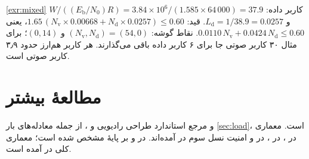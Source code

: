 \documentclass[11pt,a4paper]{article}
\begin{document}
\begin{solutionbox}{\ref{exr:mixed}}
کاربر داده: $W/((E_\mathrm{b}/N_0)R) = 3.84\times10^6/(1.585\times64\,000) = 37.9$ و
$L_\mathrm{d} = 1/38.9 = 0.0257$. قید:
$1.65\,(N_\mathrm{v}\times0.00668 + N_\mathrm{d}\times0.0257) \le 0.60$، یعنی
$0.0110\,N_\mathrm{v} + 0.0424\,N_\mathrm{d} \le 0.60$. نقاط گوشه: $(N_\mathrm{v},N_\mathrm{d}) =
(54,0)$ و $(0,14)$؛ برای مثال ۳۰ کاربر صوتی جا برای ۶ کاربر داده باقی می‌گذارند. هر کاربر
 هم‌ارز حدود ۳٫۹ کاربر صوتی است.
\end{solutionbox}

\section{مطالعهٔ بیشتر}
 و  \cite{holma2010wcdma} مرجع استاندارد طراحی رادیویی  و ،
از جمله معادله‌های بار \cref{sec:load}، است. معماری  در \cite{ts25401}،  در
\cite{ts25413}،  در \cite{ts25308} و امنیت نسل سوم در \cite{ts33102} آمده‌اند. 
در \cite{ts23228} و بر پایهٔ  \cite{rfc3261} مشخص شده است؛ معماری کلی  در
\cite{ts23002} آمده است.

\begin{latin}
\printbibliography[heading=subbibliography,title={References}]
\end{latin}
\end{document}
